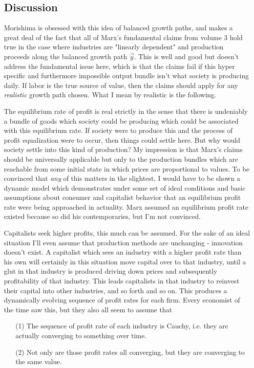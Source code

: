 \subsection{Discussion}
Morishima is obsessed with this idea of balanced growth paths, and makes a great deal of the fact that all of Marx's fundamental claims from volume 3 hold true in the case where industries are "linearly dependent" and production proceeds along the balanced growth path $\vec{y}$. This is well and good but doesn't address the fundamental issue here, which is that the claims fail if this hyper specific and furthermore impossible output bundle isn't what society is producing daily. If labor is the true source of value, then the claims should apply for any \textit{realistic} growth path chosen. What I mean by realistic is the following. \par 
The equilibrium rate of profit is real strictly in the sense that there is undeniably a bundle of goods which society could be producing which could be associated with this equilibrium rate. If society were to produce this and the process of profit equalization were to occur, then things could settle here. But why would society settle into this kind of production? My impression is that Marx's claims should be universally applicable but only to the production bundles which are reachable from some initial state in which prices are proportional to values. To be convinced that \textit{any} of this matters in the slightest, I would have to be shown a dynamic model which demonstrates under some set of ideal conditions and basic assumptions about consumer and capitalist behavior that an equilibrium profit rate were being approached in actuality. Marx assumed an equilibrium profit rate existed because so did his contemporaries, but I'm not convinced. \par 
Capitalists seek higher profits, this much can be assumed. For the sake of an ideal situation I'll even assume that production methods are unchanging - innovation doesn't exist. A capitalist which sees an industry with a higher profit rate than his own will certainly in this situation move capital over to that industry, until a glut in that industry is produced driving down prices and subsequently profitability of that industry. This leads capitalists in that industry to reinvest their capital into other industries, and so forth and so on. This produces a dynamically evolving sequence of profit rates for each firm. Every economist of the time saw this, but they also all seem to assume that
\begin{itemize}
	\item[(1)] The sequence of profit rate of each industry is Cauchy, i.e. they are actually converging to something over time. 
	\item[(2)] Not only are those profit rates all converging, but they are converging to the same value. 
\end{itemize}
